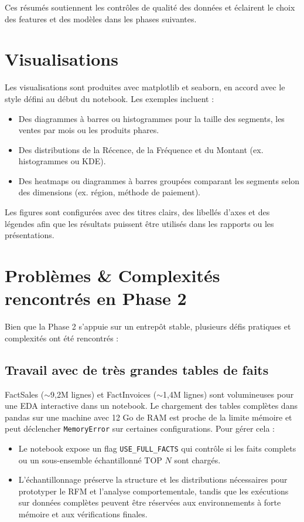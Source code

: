 \documentclass[11pt,a4paper]{article}
\begin{document}
Ces résumés soutiennent les contrôles de qualité des données et éclairent le choix des features et des modèles dans les phases suivantes.

\section{Visualisations}

Les visualisations sont produites avec matplotlib et seaborn, en accord avec le style défini au début du notebook. Les exemples incluent :
\begin{itemize}[noitemsep]
  \item Des diagrammes à barres ou histogrammes pour la taille des segments, les ventes par mois ou les produits phares.
  \item Des distributions de la Récence, de la Fréquence et du Montant (ex. histogrammes ou KDE).
  \item Des heatmaps ou diagrammes à barres groupées comparant les segments selon des dimensions (ex. région, méthode de paiement).
\end{itemize}

Les figures sont configurées avec des titres clairs, des libellés d'axes et des légendes afin que les résultats puissent être utilisés dans les rapports ou les présentations.

\section{Problèmes \& Complexités rencontrés en Phase 2}

Bien que la Phase 2 s'appuie sur un entrepôt stable, plusieurs défis pratiques et complexités ont été rencontrés :

\subsection{Travail avec de très grandes tables de faits}

FactSales ($\sim$9,2M lignes) et FactInvoices ($\sim$1,4M lignes) sont volumineuses pour une EDA interactive dans un notebook. Le chargement des tables complètes dans pandas sur une machine avec 12 Go de RAM est proche de la limite mémoire et peut déclencher \texttt{MemoryError} sur certaines configurations. Pour gérer cela :
\begin{itemize}[noitemsep]
  \item Le notebook expose un flag \texttt{USE\_FULL\_FACTS} qui contrôle si les faits complets ou un sous-ensemble échantillonné TOP $N$ sont chargés.
  \item L'échantillonnage préserve la structure et les distributions nécessaires pour prototyper le RFM et l'analyse comportementale, tandis que les exécutions sur données complètes peuvent être réservées aux environnements à forte mémoire et aux vérifications finales.
\end{itemize}
\end{document}
